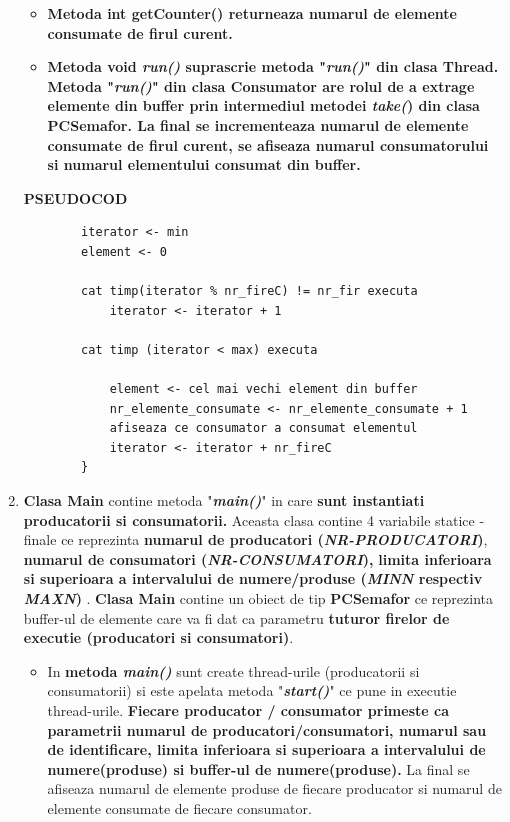 \documentclass[14pt]{article}
\begin{document}
\begin{enumerate}
\begin{itemize}
\item \textbf{Metoda int getCounter() returneaza numarul de elemente consumate de firul curent.}
\end{itemize}


\begin{itemize}
\item \textbf{Metoda void\textit{ run()} suprascrie metoda "\textit{run()}" din clasa Thread. Metoda "\textit{run()}" din clasa Consumator are rolul de a extrage elemente din buffer prin intermediul metodei \textit{take(}) din clasa PCSemafor. La final se incrementeaza numarul de elemente consumate de firul curent, se afiseaza  numarul consumatorului si numarul elementului consumat din buffer.}
\end{itemize}


 \textbf{PSEUDOCOD}
 \begin{lstlisting}
		iterator <- min
		element <- 0
		
		cat timp(iterator % nr_fireC) != nr_fir executa
			iterator <- iterator + 1

		cat timp (iterator < max) executa
		
			element <- cel mai vechi element din buffer
			nr_elemente_consumate <- nr_elemente_consumate + 1
			afiseaza ce consumator a consumat elementul
			iterator <- iterator + nr_fireC
		}
\end{lstlisting}

\item \textbf{Clasa Main }contine metoda "\textbf{\textit{main()}}" in care \textbf{sunt instantiati producatorii si consumatorii.} Aceasta clasa contine 4 variabile statice - finale ce reprezinta\textbf{ numarul de producatori (\textit{NR-PRODUCATORI})},\textbf{ numarul de consumatori (\textit{NR-CONSUMATORI}),} \textbf{limita inferioara si superioara a intervalului de numere/produse (\textit{MINN} respectiv \textit{MAXN})} . \textbf{Clasa Main} contine un obiect de tip \textbf{PCSemafor} ce reprezinta buffer-ul de elemente care va fi dat ca parametru \textbf{tuturor firelor de executie (producatori si consumatori)}.

\begin{itemize}
\item In \textbf{metoda \textit{main()}} sunt create thread-urile (producatorii si consumatorii) si este apelata metoda "\textbf{\textit{start()}}" ce pune in executie thread-urile. \textbf{Fiecare producator / consumator primeste ca parametrii numarul de producatori/consumatori, numarul sau de identificare, limita inferioara si superioara a intervalului de numere(produse) si buffer-ul de numere(produse).} La final se afiseaza numarul de elemente produse de fiecare producator si numarul de elemente consumate de fiecare consumator.
\end{itemize}
\end{enumerate}
\end{document}
